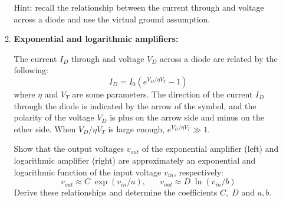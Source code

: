 \begin{enumerate}
\begin{enumerate}



  Hint: recall the relationship between the current through and voltage 
  across a diode and use the virtual ground assumption.

  \begin{comment}
  {\bf Solution:}
  \[
  \frac{V^--V}{R_1}+\frac{V_0-V}{R_2}=0,\;\;\;\;\;\;
  \frac{V^+-V}{R_3}+\frac{V_0-V}{R_4}=\frac{V}{R_L};
  \]
  Solving the first equation for $V_0-V$:
  \[
  V_0-V=(V-V^-)\frac{R_2}{R_1}=(V-V^-)\frac{R_4}{R_3}
  \]
  and substituting into the second equation, we get:
  \[
  \frac{V^+-V}{R_3}+\frac{V-V^-}{R_3}
  =\frac{V^+-V^-}{R_3}=\frac{V}{R_L}
  \]
  Solving the last equation for $V$ we get
  \[
  V=\frac{R_L}{R_3}(V^+-V^-)
  \]
  and the current through $R_L$ is:
  \[
  I_L=\frac{V}{R_L}=\frac{V^+-V^-}{R_3}
  \]
  which is a constant independent of $R_L$.
  \end{comment}

\item {\bf Exponential and logarithmic amplifiers:}


  The current $I_D$ through and voltage $V_D$ across a diode are related 
  by the following:
  \[
  I_D=I_0 \left( e^{V_D/\eta V_T}-1 \right)
  \]
  where $\eta$ and $V_T$ are some parameters. The direction of the current
  $I_D$ through the diode is indicated by the arrow of the symbol, and the 
  polarity of the voltage $V_D$ is plus on the arrow side and minus on the
  other side. When $V_D/\eta V_T$ is large enough, $e^{V_D/\eta V_T}\gg 1$.

  Show that the output voltages $v_{out}$ of the exponential amplifier 
  (left) and logarithmic amplifier (right) are approximately an exponential
  and logarithmic function of the input voltage $v_{in}$, respectively:
  \[
  v_{out}\approx C \;\exp(v_{in}/a),\;\;\;\;\;\; v_{out}\approx D\; \ln (v_{in}/b)
  \]
  Derive these relationships and determine the coefficients $C,\;D$ and 
  $a, b$.


\end{enumerate}










\end{enumerate}
